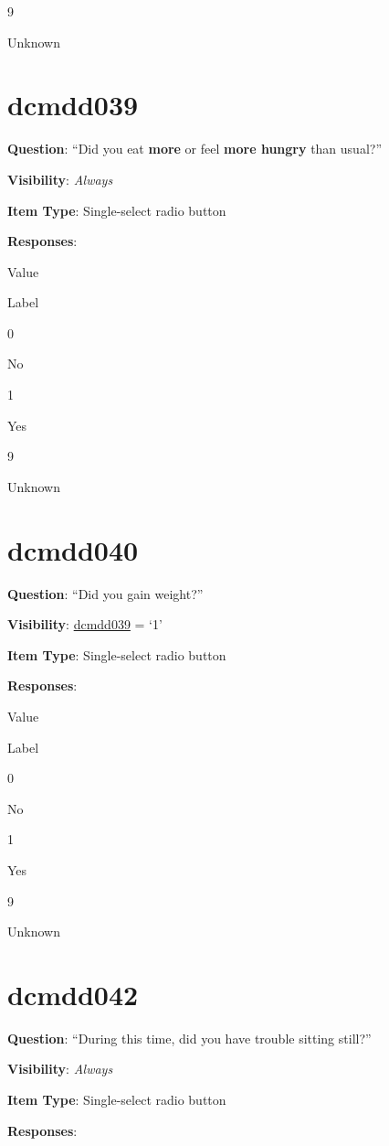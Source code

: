 \documentclass[]{book}
\begin{document}
9

Unknown

\hypertarget{dcmdd039}{%
\section{dcmdd039}\label{dcmdd039}}

\textbf{Question}: ``Did you eat \textbf{more} or feel \textbf{more hungry} than usual?''

\textbf{Visibility}: \emph{Always}

\textbf{Item Type}: Single-select radio button

\textbf{Responses}:

Value

Label

0

No

1

Yes

9

Unknown

\hypertarget{dcmdd040}{%
\section{dcmdd040}\label{dcmdd040}}

\textbf{Question}: ``Did you gain weight?''

\textbf{Visibility}: \protect\hyperlink{dcmdd039}{dcmdd039} = `1'

\textbf{Item Type}: Single-select radio button

\textbf{Responses}:

Value

Label

0

No

1

Yes

9

Unknown

\hypertarget{dcmdd042}{%
\section{dcmdd042}\label{dcmdd042}}

\textbf{Question}: ``During this time, did you have trouble sitting still?''

\textbf{Visibility}: \emph{Always}

\textbf{Item Type}: Single-select radio button

\textbf{Responses}:
\end{document}
